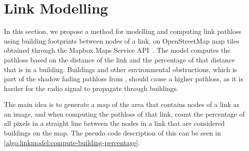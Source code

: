\section{Link Modelling}\label{sec:linkmodel}
In this section, we propose a method for modelling and computing link \gls{pathloss} using building footprints
between nodes of a link, on OpenStreetMap map tiles obtained through the Mapbox Maps Service
API~\cite{website:mapbox}. The model computes the \gls{pathloss} based on the distance of the link and the
percentage of that distance that is in a building. Buildings and other environmental obstructions, which is
part of the shadow fading \gls{pathloss} from \cite{paper:linkmodel}, should cause a higher \gls{pathloss}, as
it is harder for the radio signal to propagate through buildings. \medbreak

The main idea is to generate a map of the area that contains nodes of a link as an image, and when computing
the \gls{pathloss} of that link, count the percentage of all pixels in a straight line between the nodes in a
link that are considered buildings on the map. The pseudo code description of this can be seen in
\autoref{algo:linkmodel:compute-building-percentage}.




